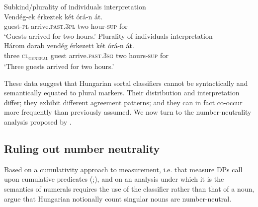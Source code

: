 \documentclass[output=paper]{langscibook}
\begin{document}
\ex \label{schv-nem:ex:31}
\ea Subkind/plurality of individuals interpretation\label{schv-nem:ex:31a}\\
\gll Vendég-ek érkeztek két órá-n át.\\
guest-\textsc{pl} arrive.\textsc{past}.\textsc{3pl} two hour-\textsc{sup} for\\%
\glt `Guests arrived for two hours.'  \hfill \citep[p.188, (14)]{schvarcz-rothstein-17} 
\ex Plurality of individuals interpretation\label{schv-nem:ex:31b}\\
\gll Három darab vendég érkezett két órá-n át.\\
three \textsc{cl\textsubscript{general}} guest  arrive.\textsc{past}.\textsc{3sg} two  hours-\textsc{sup} for\\
\glt `Three guests arrived for two hours.'   %
\z
\z


\noindent These data suggest that Hungarian sortal classifiers cannot be syntactically and semantically equated to plural markers. Their distribution and interpretation differ; they exhibit different agreement patterns; and they can in fact co-occur more frequently than previously assumed. We now turn to the number-neutrality analysis proposed by \citet{erbach-etal-19}. 

\subsection{Ruling out number neutrality} \label{schv-nem:sec:3.2}\largerpage[-1]

{\sloppy Based on a cumulativity approach to measurement, i.e. that  measure DPs call upon cumulative predicates (\citealt{krifka-89, filip-92, filip-05, nakanishi-03};\linebreak \citealt{schwarzschild-06}), and on an analysis under which it is the  semantics of numerals requires the use of the classifier rather than that of a noun, \citep{krifka-95, erbach-etal-19, sudo-17} argue that Hungarian notionally count singular nouns are number-neutral.}
\end{document}
